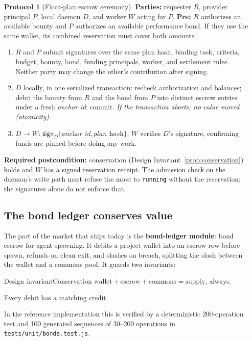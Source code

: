 \documentclass[11pt,a4paper]{article}
\theoremstyle{definition}
\theoremstyle{definition}
\newtheorem{protocol}{Protocol}[section]
\theoremstyle{remark}
\begin{document}
\begin{protocol}[Float-plan escrow ceremony]\label{prot:escrow}
\pdstatus{\Designed}{}
\textbf{Parties:} requester $R$, provider principal
$P$, local daemon $D$, and worker $W$ acting for $P$.
\textbf{Pre:} $R$ authorizes an available bounty and $P$ authorizes an available
performance bond. If they use the same wallet, its combined reservation must
cover both amounts.
\begin{enumerate}[leftmargin=2.0em,itemsep=1pt,topsep=2pt]
  \item $R$ and $P$ submit signatures over the same plan hash, binding task,
    criteria, budget, bounty, bond, funding principals, worker, and settlement
    rules. Neither party may change the other's contribution after signing.
  \item $D$ locally, in one serialized transaction:
    recheck authorization and balances; debit the bounty from $R$ and the bond
    from $P$ into distinct escrow entries under a fresh \textit{anchor id};
    commit. \emph{If the transaction aborts,
    no value moved (atomicity).}
  \item $D \to W$: $\mathsf{sign}_D\{\textit{anchor id}, \textit{plan hash}\}$.
    $W$ verifies $D$'s signature, confirming funds are pinned before doing any work.
\end{enumerate}
\textbf{Required postcondition:} conservation (Design Invariant~\ref{prop:conservation})
holds and $W$ has a signed reservation receipt. The admission check on the
daemon's write path must refuse the move to \texttt{running} without the
reservation; the signatures alone do not enforce that.
\end{protocol}



\subsection{The bond ledger conserves value}
\pdstatus{\Built}{}

The part of the market that ships today is the \textbf{bond-ledger module}:
bond escrow for agent spawning. It
debits a project wallet into an escrow row before spawn, refunds on clean exit, and
slashes on breach, splitting the slash between the wallet and a commons pool. It
guards two invariants:

%
\begin{pdclaim}{Design invariant}{Conservation}
\setlength{\parskip}{4pt plus 1pt}
\label{prop:conservation}
$\text{wallet} + \text{escrow} + \text{commons} = \text{supply}$, always.

Every
debit has a matching credit.

In the reference implementation this is verified
by a deterministic 200-operation test and 100 generated sequences of
30--200 operations in \texttt{tests/unit/bonds.test.js}.
\end{pdclaim}
\end{document}
